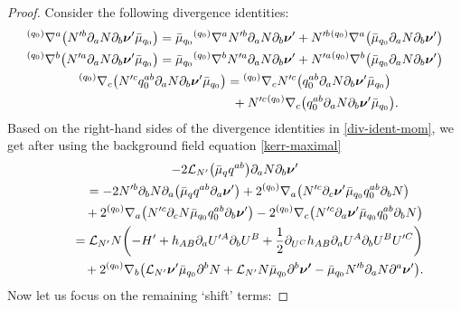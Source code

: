 \documentclass[11pt]{article}
\numberwithin{equation}{section}
\def\ptl{\partial}%
\def\mbo#1{\boldsymbol{#1}}%
\def\grad{{\nabla}}%
\newcommand{\leftexp}[2]{{\vphantom{#2}}^{#1}{#2}}
\def\halb{\frac{1}{2}}%
\numberwithin{equation}{section}
\begin{document}
\begin{proof}
Consider the following divergence identities:
\begin{subequations} \label{div-ident-mom}
\begin{gather}
\leftexp{(q_0)}{\grad}^a \bigl(N'^b \ptl_a N \ptl_b \mbo{\nu}' \bar{\mu}_{q_0}\bigr)= \bar{\mu}_{q_0} \leftexp{(q_0)}{\grad}^a N'^b \ptl_a N \ptl_b \mbo{\nu}' + N'^b \leftexp{(q_0)}{\grad}^a \bigl(\bar{\mu}_{q_0} \ptl_a N \ptl_b \mbo{\nu}'\bigr) \\
\leftexp{(q_0)}{\grad}^b \bigl(N'^a \ptl_a N \ptl_b \mbo{\nu}' \bar{\mu}_{q_0}\bigr)= \bar{\mu}_{q_0} \leftexp{(q_0)}{\grad}^b N'^a \ptl_a N \ptl_b \mbo{\nu}' + N'^a \leftexp{(q_0)}{\grad}^b \bigl(\bar{\mu}_{q_0} \ptl_a N \ptl_b \mbo{\nu}'\bigr) \\
\leftexp{(q_0)}{\grad}_c \bigl(N'^c q^{ab}_0 \ptl_a N \ptl_b \mbo{\nu}' \bar{\mu}_{q_0}\bigr)= \leftexp{(q_0)}{\grad}_c N'^c\bigl(q^{ab}_0 \ptl_a N \ptl_b \mbo{\nu}' \bar{\mu}_{q_0}\bigr)\nonumber\\ \hphantom{\leftexp{(q_0)}{\grad}_c \bigl(N'^c q^{ab}_0 \ptl_a N \ptl_b \mbo{\nu}' \bar{\mu}_{q_0}\bigr)=}{}
+ N'^c \leftexp{(q_0)}{\grad}_c \bigl(q^{ab}_0 \ptl_a N \ptl_b \mbo{\nu}' \bar{\mu}_{q_0}\bigr).
\end{gather}
\end{subequations}
Based on the right-hand sides of the divergence identities in \eqref{div-ident-mom}, we get after using the background field equation \eqref{kerr-maximal}
\begin{gather*}
-2 \mathcal{L}_{N'} \bigl(\bar{\mu}_q q^{ab}\bigr) \ptl_a N \ptl_b \mbo{\nu}' \notag\\
\qquad{}= -2 N'^b \ptl_b N \ptl_a \bigl(\bar{\mu}_q q^{ab} \ptl_a \mbo{\nu}'\bigr) + 2 \leftexp{(q_0)}{\grad}_a \bigl(N'^c \ptl_c \mbo{\nu}' \bar{\mu}_{q_0} q^{ab}_0 \ptl_b N\bigr) \notag\\
\qquad\quad{} + 2 \leftexp{(q_0)}{\grad}_a \bigl(N'^c \ptl_c N \bar{\mu}_{q_0} q^{ab}_0 \ptl_b \mbo{\nu}'\bigr) - 2 \leftexp{(q_0)}{\grad}_c \bigl(N'^c \ptl_a \mbo{\nu}' \bar{\mu}_{q_0} q^{ab}_0 \ptl_b N\bigr) \notag\\
\qquad{}= \mathcal{L}_{N'} N \biggl(- H' + h_{AB} \ptl_a U'^A \ptl_b U^B + \halb \ptl_{U^C} h_{AB} \ptl_a U^A \ptl_b U^B U'^C\biggr) \notag\\
\qquad\quad{} + 2 \leftexp{(q_0)}{\grad}_b \bigl(\mathcal{L}_{N'} \mbo{\nu}' \bar{\mu}_{q_0} \ptl^b N+ \mathcal{L}_{N'} N \bar{\mu}_{q_0} \ptl^b \mbo{\nu'} - \bar{\mu}_{q_0} N'^b \ptl_a N \ptl^a \mbo{\nu}'\bigr).
\end{gather*}
Now let us focus on the remaining `shift' terms:

\end{proof}
\end{document}
